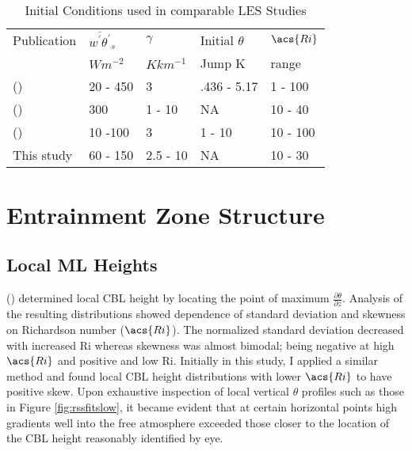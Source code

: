 \begin{table}[htbp]
\caption[Initial Conditions used in comparable \acs{LES} Studies]{Initial Conditions used in comparable \acs{LES} Studies}

    \begin{center}
    \begin{tabular}{ p{4cm} p{1.4cm} p{1.4cm} p{1.7cm} p{1.8cm}}
Publication & $\overline{w^{'}\theta^{'}}_{s}$& $\gamma$& Initial $\theta$ & $\acs{Ri}$ \\ 
& $Wm^{-2}$ & $Kkm^{-1}$ & Jump K & range \\ \hline
      \citeauthor{SullMoengStev} (\citeyear{SullMoengStev}) & 20 - 450& 3  &.436 - 5.17 & 1 - 100\\ %
      \citeauthor{FedConzMir04} (\citeyear{FedConzMir04}) & 300 & 1 - 10 & NA & 10 - 40\\ %
      \citeauthor{BrooksFowler2} (\citeyear{BrooksFowler2}) &  10 -100 &  3& 1 - 10 &10 - 100 \\ %
      This study & 60 - 150 & 2.5 - 10& NA & 10 - 30\\ \hline 
      
    \end{tabular}
\label{table:initconditcomp}   
\end{center}    
\end{table}


\section{Entrainment Zone Structure}
\label{sec:entzonestruc}
\subsection{Local \acs{ML} Heights}

\citeauthor{SullMoengStev} (\citeyear{SullMoengStev}) determined local \acs{CBL} height by locating the point of maximum $\frac{\partial \theta}{\partial z}$.  Analysis of the resulting distributions showed dependence of standard deviation and skewness on Richardson number ($\acs{Ri}$).  The normalized standard deviation decreased with increased \acs{Ri} whereas skewness was almost bimodal; being negative at high $\acs{Ri}$ and positive and low \acs{Ri}.  Initially in this study, I applied a similar method and found local \acs{CBL} height distributions with lower $\acs{Ri}$ to have positive skew.  Upon exhaustive inspection of local vertical $\theta$  profiles such as those in Figure \ref{fig:rssfitslow}, it became evident that at certain horizontal points high gradients well into the free atmosphere exceeded those closer to the location of the \acs{CBL} height reasonably identified by eye.\\

